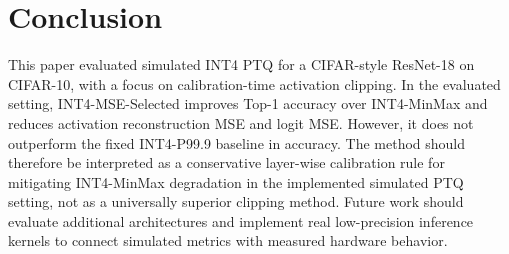 
\section{Conclusion}
\label{sec:conclusion}

This paper evaluated simulated INT4 PTQ for a CIFAR-style ResNet-18 on CIFAR-10, with a focus on calibration-time activation clipping. In the evaluated setting, INT4-MSE-Selected improves Top-1 accuracy over INT4-MinMax and reduces activation reconstruction MSE and logit MSE. However, it does not outperform the fixed INT4-P99.9 baseline in accuracy. The method should therefore be interpreted as a conservative layer-wise calibration rule for mitigating INT4-MinMax degradation in the implemented simulated PTQ setting, not as a universally superior clipping method. Future work should evaluate additional architectures and implement real low-precision inference kernels to connect simulated metrics with measured hardware behavior.
